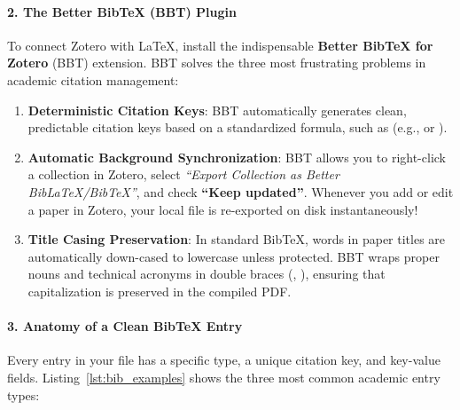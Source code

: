 \paragraph{2. The Better Bib\TeX{} (BBT) Plugin}
To connect Zotero with \LaTeX{}, install the indispensable \textbf{Better Bib\TeX{} for Zotero} (BBT) extension. BBT solves the three most frustrating problems in academic citation management:
\begin{enumerate}
    \item \textbf{Deterministic Citation Keys}: BBT automatically generates clean, predictable citation keys based on a standardized formula, such as  (e.g.,  or ).
    \item \textbf{Automatic Background Synchronization}: BBT allows you to right-click a collection in Zotero, select \emph{``Export Collection as Better Bib\LaTeX{}/Bib\TeX{}''}, and check \textbf{``Keep updated''}. Whenever you add or edit a paper in Zotero, your local  file is re-exported on disk instantaneously!
    \item \textbf{Title Casing Preservation}: In standard Bib\TeX{}, words in paper titles are automatically down-cased to lowercase unless protected. BBT wraps proper nouns and technical acronyms in double braces (, ), ensuring that capitalization is preserved in the compiled PDF.
\end{enumerate}

\paragraph{3. Anatomy of a Clean Bib\TeX{} Entry}
Every entry in your  file has a specific type, a unique citation key, and key-value fields. Listing~\ref{lst:bib_examples} shows the three most common academic entry types:


